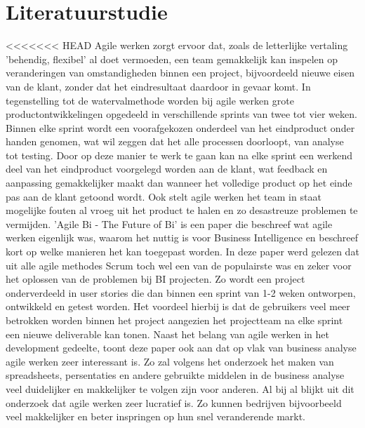 \documentclass{hogent-article}
\begin{document}
\section{Literatuurstudie}

<<<<<<< HEAD
Agile werken zorgt ervoor dat, zoals de letterlijke vertaling 'behendig, flexibel' al doet vermoeden, een team gemakkelijk kan inspelen op veranderingen van omstandigheden binnen een project, bijvoordeeld nieuwe eisen van de klant, zonder dat het eindresultaat daardoor in gevaar komt. In tegenstelling tot de watervalmethode worden bij agile werken grote productontwikkelingen opgedeeld in verschillende sprints van twee tot vier weken. Binnen elke sprint wordt een voorafgekozen onderdeel van het eindproduct onder handen genomen, wat wil zeggen dat het alle processen doorloopt, van analyse tot testing. Door op deze manier te werk te gaan kan na elke sprint een werkend deel van het eindproduct voorgelegd worden aan de klant, wat feedback en aanpassing gemakkelijker maakt dan wanneer het volledige product op het einde pas aan de klant getoond wordt. Ook stelt agile werken het team in staat mogelijke fouten al vroeg uit het product te halen en zo desastreuze problemen te vermijden.\newline
\newline 
'Agile Bi - The Future of Bi'\autocite{Muntean2013} is een paper die beschreef wat agile werken eigenlijk was, waarom het nuttig is voor Business Intelligence en beschreef kort op welke manieren het kan toegepast worden. In deze paper werd gelezen dat uit alle agile methodes Scrum toch wel een van de populairste was en zeker voor het oplossen van de problemen bij BI projecten. Zo wordt een project onderverdeeld in user stories die dan binnen een sprint van 1-2 weken ontworpen, ontwikkeld en getest worden. Het voordeel hierbij is dat de gebruikers veel meer betrokken worden binnen het project aangezien het projectteam na elke sprint een nieuwe deliverable kan tonen. Naast het belang van agile werken in het development gedeelte, toont deze paper ook aan dat op vlak van business analyse agile werken zeer interessant is. Zo zal volgens het onderzoek het maken van spreadsheets, persentaties en andere gebruikte middelen in de business analyse veel duidelijker en makkelijker te volgen zijn voor anderen. Al bij al blijkt uit dit onderzoek dat agile werken zeer lucratief is. Zo kunnen bedrijven bijvoorbeeld veel makkelijker en beter inspringen op hun snel veranderende markt. \newline
\end{document}
